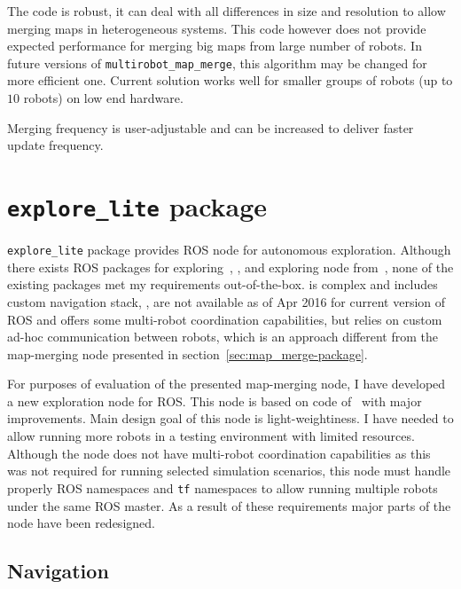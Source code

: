 The code is robust, it can deal with all differences in size and resolution to allow merging maps in heterogeneous systems. This code however does not provide expected performance for merging big maps from large number of robots. In future versions of \texttt{multi\-rob\-ot\_map\_merge}, this algorithm may be changed for more efficient one.
Current solution works well for smaller groups of robots (up to $10$ robots) on low end hardware.

Merging frequency is user-adjustable and can be increased to deliver faster update frequency.

\section{\texttt{explore\_lite} package} %
\label{sec:explore_lite-package}

\texttt{explore\_lite} package provides \gls{ROS} node for autonomous exploration. Although there exists \gls{ROS} packages for exploring~\cite{2013:RoboCup}, \cite{DuHadway2010}, \cite{Bovbel2010} and exploring node from~\cite{Andre2014}, none of the existing packages met my requirements out-of-the-box. \cite{2013:RoboCup} is complex and includes custom navigation stack, \cite{DuHadway2010}, \cite{Bovbel2010} are not available as of Apr 2016 for current version of \gls{ROS} and \cite{Andre2014} offers some multi-robot coordination capabilities, but relies on custom ad-hoc communication between robots, which is an approach different from the map-merging node presented in section~\ref{sec:map_merge-package}.

For purposes of evaluation of the presented map-merging node, I have developed a new exploration node for \gls{ROS}. This node is based on code of~\cite{DuHadway2010} with major improvements. Main design goal of this node is light-weightiness. I have needed to allow running more robots in a testing environment with limited resources. Although the node does not have multi-robot coordination capabilities as this was not required for running selected simulation scenarios, this node must handle properly \gls{ROS} namespaces and \texttt{tf} namespaces to allow running multiple robots under the same \gls{ROS} master. As a result of these requirements major parts of the node have been redesigned.

\subsection{Navigation}


